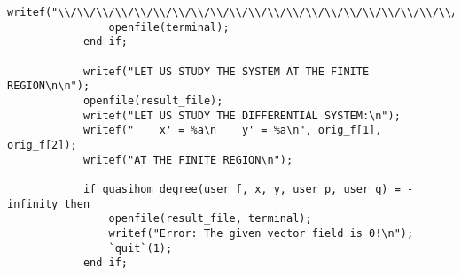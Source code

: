 \documentclass[a4paper,10pt]{article}
\begin{document}
\begin{lstlisting}[name=main]
                writef("\\/\\/\\/\\/\\/\\/\\/\\/\\/\\/\\/\\/\\/\\/\\/\\/\\/\\/\\/\\/\\/\\/\\/\\/\\/\\/\\/\\/\\/\\/\\/\\/\\/\\/\\/\\/\\/\\/\\/\\/\n\n");
                openfile(terminal);
            end if;

            writef("LET US STUDY THE SYSTEM AT THE FINITE REGION\n\n");
            openfile(result_file);
            writef("LET US STUDY THE DIFFERENTIAL SYSTEM:\n");
            writef("    x' = %a\n    y' = %a\n", orig_f[1], orig_f[2]);
            writef("AT THE FINITE REGION\n");

            if quasihom_degree(user_f, x, y, user_p, user_q) = -infinity then
                openfile(result_file, terminal);
                writef("Error: The given vector field is 0!\n");
                `quit`(1);
            end if;


\end{lstlisting}
\end{document}
